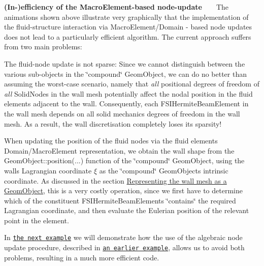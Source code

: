 \begin{DoxyItemize}
\item {\bfseries (In-\/)efficiency of the Macro\+Element-\/based node-\/update} ~\newline
~\newline
 The animations shown above illustrate very graphically that the implementation of the fluid-\/structure interaction via {\ttfamily Macro\+Element/\+Domain} -\/ based node updates does not lead to a particularly efficient algorithm. The current approach suffers from two main problems\+:
\begin{DoxyEnumerate}
\item The fluid-\/node update is not sparse\+: Since we cannot distinguish between the various sub-\/objects in the \char`\"{}compound\char`\"{} {\ttfamily Geom\+Object}, we can do no better than assuming the worst-\/case scenario, namely that {\itshape all} positional degrees of freedom of {\itshape all} {\ttfamily Solid\+Nodes} in the wall mesh potentially affect the nodal position in the fluid elements adjacent to the wall. Consequently, each {\ttfamily F\+S\+I\+Hermite\+Beam\+Element} in the wall mesh depends on all solid mechanics degrees of freedom in the wall mesh. As a result, the wall discretisation completely loses its sparsity!
\item When updating the position of the fluid nodes via the fluid element\textquotesingle{}s {\ttfamily Domain/\+Macro\+Element} representation, we obtain the wall shape from the {\ttfamily Geom\+Object\+::position}(...) function of the \char`\"{}compound\char`\"{} {\ttfamily Geom\+Object}, using the wall\textquotesingle{}s Lagrangian coordinate $ \xi $ as the \char`\"{}compound\char`\"{} {\ttfamily Geom\+Object\textquotesingle{}s} intrinsic coordinate. As discussed in the section \hyperlink{index_wall_geom_object}{Representing the wall mesh as a Geom\+Object}, this is a very costly operation, since we first have to determine which of the constituent {\ttfamily F\+S\+I\+Hermite\+Beam\+Elements} \char`\"{}contains\char`\"{} the required Lagrangian coordinate, and then evaluate the Eulerian position of the relevant point in the element.
\end{DoxyEnumerate}In \href{../../../interaction/fsi_collapsible_channel_algebraic/html/index.html}{\tt the next example} we will demonstrate how the use of the algebraic node update procedure, described in \href{../../../navier_stokes/algebraic_collapsible_channel/html/index.html}{\tt an earlier example}, allows us to avoid both problems, resulting in a much more efficient code.
\end{DoxyItemize}



